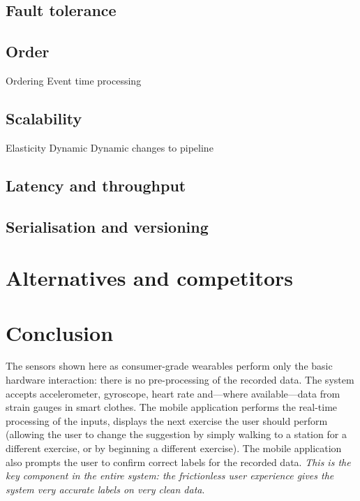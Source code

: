 \documentclass[a4paper, 10 pt, conference]{IEEEtran}
\begin{document}
\subsection{Fault tolerance}

\subsection{Order}
Ordering
Event time processing

\subsection{Scalability}
Elasticity
Dynamic
Dynamic changes to pipeline

\subsection{Latency and throughput}

\subsection{Serialisation and versioning}

\section{Alternatives and competitors}

\section{Conclusion}











The sensors shown here as consumer-grade wearables perform only the basic hardware interaction: there is no pre-processing of the recorded data. The system accepts accelerometer, gyroscope, heart rate and---where available---data from strain gauges in smart clothes. The mobile application performs the real-time processing of the inputs, displays the next exercise the user should perform (allowing the user to change the suggestion by simply walking to a station for a different exercise, or by beginning a different exercise). The mobile application also prompts the user to confirm correct labels for the recorded data. \emph{This is the key component in the entire system: the frictionless user experience gives the system very accurate labels on very clean data}.
\end{document}
